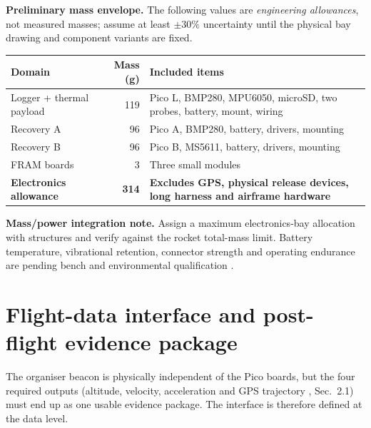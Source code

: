 \textbf{Preliminary mass envelope.} The following values are \emph{engineering allowances}, not measured masses; assume at least $\pm30\%$ uncertainty until the physical bay drawing and component variants are fixed.
\par\medskip
\small
{}
\begin{tabularx}{\linewidth}{@{}L{45mm}r Y@{}}
\toprule{}\textbf{Domain}&\textbf{Mass (g)}&\textbf{Included items}\\\midrule
Logger + thermal payload & 119 & Pico L, BMP280, MPU6050, microSD, two probes, battery, mount, wiring\\
Recovery A & 96 & Pico A, BMP280, battery, drivers, mounting\\
Recovery B & 96 & Pico B, MS5611, battery, drivers, mounting\\
FRAM boards & 3 & Three small modules\\
\midrule
\textbf{Electronics allowance} & \textbf{314} & \textbf{Excludes GPS, physical release devices, long harness and airframe hardware}\\
\bottomrule
\end{tabularx}\par
\normalsize

\textbf{Mass/power integration note.} Assign a maximum electronics-bay allocation with structures and verify against the rocket total-mass limit. Battery temperature, vibrational retention, connector strength and operating endurance are pending bench and environmental qualification \cite{rtc2027app03,rtc2027app08}.

\section{Flight-data interface and post-flight evidence package}
\label{sec:dataflow}
The organiser beacon is physically independent of the Pico boards, but the four required outputs (altitude, velocity, acceleration and GPS trajectory \cite{rtc2027app03}, Sec.~2.1) must end up as one usable evidence package. The interface is therefore defined at the data level.

